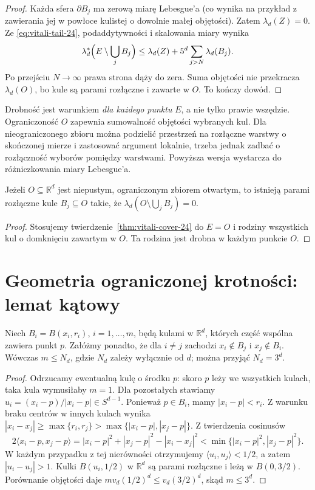 \begin{proof}
Każda sfera $\partial B_j$ ma zerową miarę Lebesgue'a
(co wynika na przykład z zawierania jej w powłoce kulistej
o dowolnie małej objętości). Zatem $\lambda_d(Z)=0$.
Ze \eqref{eq:vitali-tail-24}, podaddytywności i skalowania
miary wynika
\[
 \lambda_d^*\Bigl(E\setminus\bigcup_jB_j\Bigr)
 \le\lambda_d(Z)+5^d\sum_{j>N}\lambda_d(B_j).
\]
Po przejściu $N\to\infty$ prawa strona dąży do zera.
Suma objętości nie przekracza $\lambda_d(O)$, bo kule są
parami rozłączne i zawarte w $O$. To kończy dowód.
\end{proof}

\begin{uwaga}
Drobność jest warunkiem \emph{dla każdego punktu} $E$,
a nie tylko prawie wszędzie. Ograniczoność $O$ zapewnia
sumowalność objętości wybranych kul. Dla nieograniczonego
zbioru można podzielić przestrzeń na rozłączne warstwy
o skończonej mierze i zastosować argument lokalnie,
trzeba jednak zadbać o rozłączność wyborów pomiędzy warstwami.
Powyższa wersja wystarcza do różniczkowania miary Lebesgue'a.
\end{uwaga}

\begin{wniosek}
\label{cor:vitali-open-24}
Jeżeli $O\subseteq\mathbb R^d$ jest niepustym,
ograniczonym zbiorem otwartym, to istnieją parami rozłączne
kule $B_j\subseteq O$ takie, że
$\lambda_d(O\setminus\bigcup_jB_j)=0$.
\end{wniosek}
\begin{proof}
Stosujemy twierdzenie~\ref{thm:vitali-cover-24} do $E=O$
i rodziny wszystkich kul o domknięciu zawartym w $O$.
Ta rodzina jest drobna w każdym punkcie $O$.
\end{proof}

\section{Geometria ograniczonej krotności: lemat kątowy}
\begin{lemat}
\label{lem:besicovitch-angle-24}
Niech $B_i=B(x_i,r_i)$, $i=1,\ldots,m$, będą kulami
w $\mathbb R^d$, których część wspólna zawiera punkt $p$.
Załóżmy ponadto, że dla $i\ne j$ zachodzi
$x_i\notin B_j$ i $x_j\notin B_i$.
Wówczas $m\le N_d$, gdzie $N_d$ zależy wyłącznie od $d$;
można przyjąć $N_d=3^d$.
\end{lemat}
\begin{proof}
Odrzucamy ewentualną kulę o środku $p$: skoro $p$ leży
we wszystkich kulach, taka kula wymusiłaby $m=1$.
Dla pozostałych stawiamy $u_i=(x_i-p)/|x_i-p|\in S^{d-1}$.
Ponieważ $p\in B_i$, mamy $|x_i-p|<r_i$.
Z warunku braku centrów w innych kulach wynika
$|x_i-x_j|\ge\max\{r_i,r_j\}>
\max\{|x_i-p|,|x_j-p|\}$.
Z twierdzenia cosinusów
\[
 2\langle x_i-p,x_j-p\rangle
 =|x_i-p|^2+|x_j-p|^2-|x_i-x_j|^2
 <\min\{|x_i-p|^2,|x_j-p|^2\}.
\]
W każdym przypadku z tej
nierówności otrzymujemy
$\langle u_i,u_j\rangle<1/2$, a zatem
$|u_i-u_j|>1$. Kulki $B(u_i,1/2)$ w $\mathbb R^d$
są parami rozłączne i leżą w $B(0,3/2)$.
Porównanie objętości daje
$m v_d(1/2)^d\le v_d(3/2)^d$, skąd $m\le3^d$.
\end{proof}

